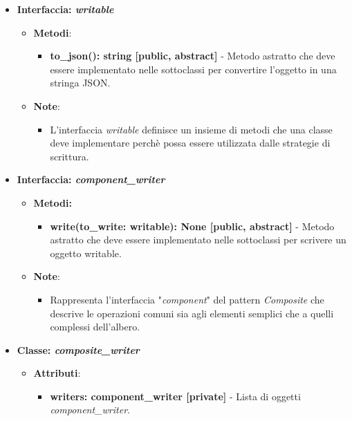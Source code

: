 \begin{itemize}
    \item{\textbf{Interfaccia: \textit{writable}}}
    \begin{itemize}
        \item\textbf{Metodi}: 
        \begin{itemize}
            \item \textbf{to\_json(): string [public, abstract]} - Metodo astratto che deve essere implementato nelle sottoclassi per convertire l'oggetto in una stringa JSON.
        \end{itemize}
        \item\textbf{Note}:
        \begin{itemize}
            \item L'interfaccia \textit{writable} definisce un insieme di metodi che una classe deve implementare perchè possa essere utilizzata dalle strategie di scrittura.
        \end{itemize}
    \end{itemize}
    \item{\textbf{Interfaccia: \textit{component\_writer}}}
     \begin{itemize}
        \item \textbf{Metodi:}
         \begin{itemize}
            \item \textbf{write(to\_write: writable): None [public, abstract]} - Metodo astratto che deve essere implementato nelle sottoclassi per scrivere un oggetto writable.
        \end{itemize}
        \item\textbf{Note}:
        \begin{itemize}
            \item Rappresenta l'interfaccia "\textit{component}" del pattern \textit{Composite} che descrive le operazioni comuni sia agli elementi semplici che a quelli complessi dell'albero.
        \end{itemize}
    \end{itemize}
    \item{\textbf{Classe: \textit{composite\_writer}}}
    \begin{itemize}
    \item\textbf{Attributi}:
        \begin{itemize}
        \item \textbf{writers: component\_writer [private]} - Lista di oggetti \textit{component\_writer}.
    \end{itemize}

\end{itemize}
\end{itemize}

